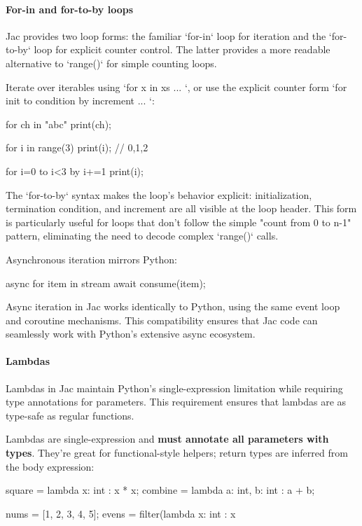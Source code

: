 \paragraph{For-in and for-to-by loops}

Jac provides two loop forms: the familiar `for-in` loop for iteration and the `for-to-by` loop for explicit counter control. The latter provides a more readable alternative to `range()` for simple counting loops.

Iterate over iterables using `for x in xs { ... }`, or use the explicit counter form `for init to condition by increment { ... }`:

\begin{jacblock}
for ch in "abc" { print(ch); }

for i in range(3) {
    print(i);  // 0,1,2
}

for i=0 to i<3 by i+=1 {
    print(i);
}
\end{jacblock}

The `for-to-by` syntax makes the loop's behavior explicit: initialization, termination condition, and increment are all visible at the loop header. This form is particularly useful for loops that don't follow the simple "count from 0 to n-1" pattern, eliminating the need to decode complex `range()` calls.

Asynchronous iteration mirrors Python:

\begin{jacblock}
async for item in stream {
    await consume(item);
}
\end{jacblock}

Async iteration in Jac works identically to Python, using the same event loop and coroutine mechanisms. This compatibility ensures that Jac code can seamlessly work with Python's extensive async ecosystem.

\paragraph{Lambdas}

Lambdas in Jac maintain Python's single-expression limitation while requiring type annotations for parameters. This requirement ensures that lambdas are as type-safe as regular functions.

Lambdas are single-expression and \textbf{must annotate all parameters with types}. They're great for functional-style helpers; return types are inferred from the body expression:

\begin{jacblock}
square = lambda x: int : x * x;
combine = lambda a: int, b: int : a + b;

nums = [1, 2, 3, 4, 5];
evens = filter(lambda x: int : x %
\end{jacblock}

